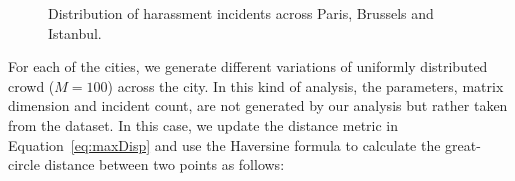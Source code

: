 \documentclass{acm_proc_article-sp}
\begin{document}
\begin{figure}[!h]
\centering
{}\par\medskip
{}\par\medskip     
{}
\caption{Distribution of harassment incidents across Paris, Brussels and Istanbul.}
\label{fig:citiesDistribution}
\end{figure}
For each of the cities, we generate different variations of uniformly distributed crowd ($M = 100$) across the city. In this kind of analysis, the parameters, matrix dimension and incident count, are not generated by our analysis but rather taken from the dataset. In this case, we update the distance metric in Equation~\ref{eq:maxDisp} and use the Haversine formula to calculate the great-circle distance between two points as follows:
\end{document}
